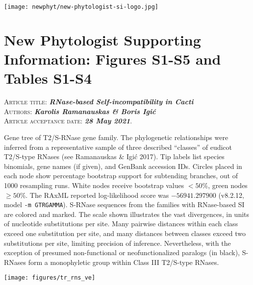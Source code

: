 \documentclass[11pt]{article}
\begin{document}
\begin{center}
	\texttt{[image: newphyt/new-phytologist-si-logo.jpg]}
\end{center}

\section*{New Phytologist Supporting Information: Figures S1-S5 and Tables S1-S4}
\bigskip
\textsc{Article title}: \textbf{\em RNase-based Self-incompatibility in Cacti}\\
\textsc{Authors}: \textbf{\em Karolis Ramanauskas \& Boris Igi{\'c}}\\
\textsc{Article acceptance date}:  \textbf{\em28 May 2021}.

\clearpage

%
%
\begin{suppfigure}
\centering
\caption{Gene tree of T2/S-RNase gene family.
The phylogenetic relationships were inferred from a representative sample of three described ``classes'' of eudicot T2/S-type RNases (see Ramanauskas \& Igi{\'c} 2017).
Tip labels list species binomials, gene names (if given), and GenBank accession IDs.
Circles placed in each node show percentage bootstrap support for subtending branches, out of 1000 resampling runs.
White nodes receive bootstrap values $<50$\%, green nodes $\geq50$\%.
The RAxML reported log-likelihood score was $-56941.297900$ (v8.2.12, model \texttt{-m GTRGAMMA}).
S-RNase sequences from the families with RNase-based SI are colored and marked.
The scale shown illustrates the vast divergences, in units of nucleotide substitutions per site.
Many pairwise distances within each class exceed one substitution per site, and many distances between classes exceed two substitutions per site, limiting precision of inference.
Nevertheless, with the exception of presumed non-functional or neofunctionalized paralogs (in black), S-RNases form a monophyletic group within Class III T2/S-type RNases.
}
\texttt{[image: figures/tr\_rns\_ve]}
\label{fig:rnase-tree}
\end{suppfigure}
\clearpage


%
%
\end{document}
